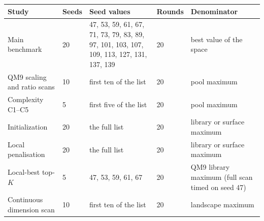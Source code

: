 \begin{tabular}{p{3.1cm}p{1.1cm}p{5.9cm}p{1.15cm}p{3.0cm}}
\toprule
Study & Seeds & Seed values & Rounds & Denominator \\
\midrule
Main benchmark & 20 & 47, 53, 59, 61, 67, 71, 73, 79, 83, 89, 97, 101, 103, 107, 109, 113, 127, 131, 137, 139 & 20 & best value of the space \\
QM9 scaling and ratio scans & 10 & first ten of the list & 20 & pool maximum \\
Complexity C1--C5 & 5 & first five of the list & 20 & pool maximum \\
Initialization & 20 & the full list & 20 & library or surface maximum \\
Local penalisation & 20 & the full list & 20 & library or surface maximum \\
Local-best top-$K$ & 5 & 47, 53, 59, 61, 67 & 20 & QM9 library maximum (full scan timed on seed 47) \\
Continuous dimension scan & 10 & first ten of the list & 20 & landscape maximum \\
\bottomrule
\end{tabular}
